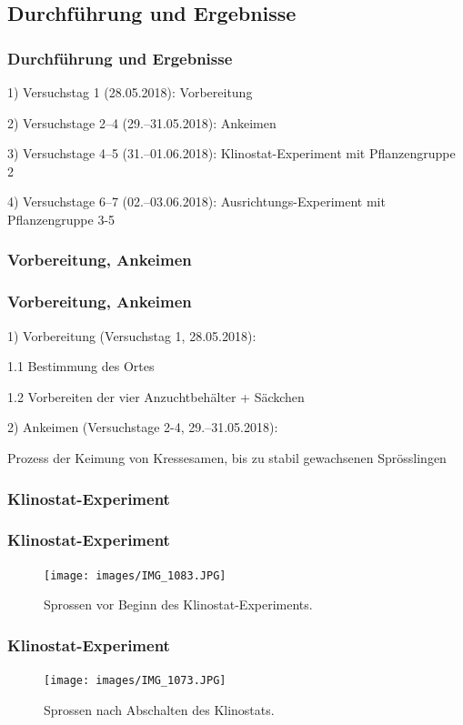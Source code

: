 \documentclass[aspectratio=169]{beamer}
\begin{document}
	\subsection{Durchführung und Ergebnisse}
	
	\begin{frame}
		\frametitle{Durchführung und Ergebnisse}
		
		1) Versuchstag 1 (28.05.2018): Vorbereitung
		
		2) Versuchstage 2–4 (29.–31.05.2018): Ankeimen
		
		3) Versuchstage 4–5 (31.–01.06.2018): Klinostat-Experiment mit Pflanzengruppe 2
		
		4) Versuchstage 6–7 (02.–03.06.2018): Ausrichtungs-Experiment mit Pflanzengruppe 3-5
	\end{frame}
	
	\subsubsection{Vorbereitung, Ankeimen}
	
	\begin{frame}
		\frametitle{Vorbereitung, Ankeimen}
		1) Vorbereitung (Versuchstag 1, 28.05.2018):
		
	 	1.1 Bestimmung des Ortes
			
		1.2 Vorbereiten der vier Anzuchtbehälter + Säckchen 
			
		2) Ankeimen (Versuchstage 2-4, 29.–31.05.2018):
		
		Prozess der Keimung von Kressesamen, bis zu stabil gewachsenen Sprösslingen
				
		
	\end{frame}
	
	\subsubsection{Klinostat-Experiment}
	
	\begin{frame}
		\frametitle{Klinostat-Experiment}
		
	\begin{figure}[H]
	\centering
	\texttt{[image: images/IMG\_1083.JPG]}
	\caption{Sprossen vor Beginn des Klinostat-Experiments.\label{Foto 1}}	
	\end{figure}	
	
	\end{frame}

\begin{frame}
\frametitle{Klinostat-Experiment}

\begin{figure}[H]
	\centering		 \texttt{[image: images/IMG\_1073.JPG]}	\caption{Sprossen nach Abschalten des Klinostats.\label{Foto 2}}
	
\end{figure}

\end{frame}
\end{document}

